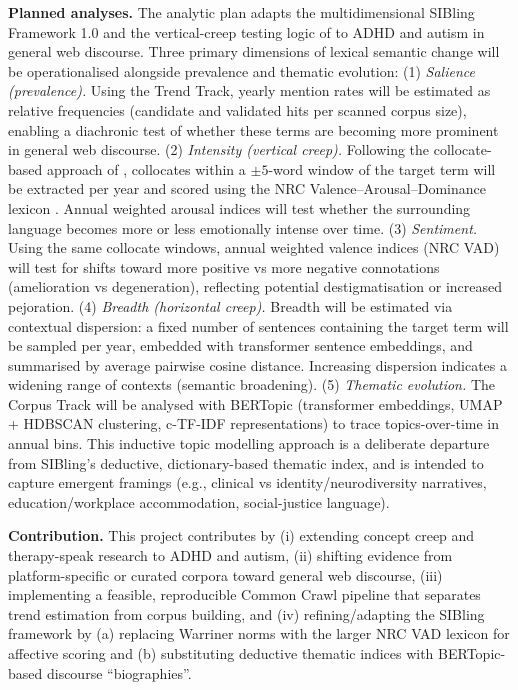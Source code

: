 \documentclass[12pt,letterpaper]{article}
\begin{document}
	\textbf{Planned analyses.} The analytic plan adapts the multidimensional SIBling Framework 1.0 \citep{baesNaomibaesLexical_semantic_change_framework2024} and the vertical-creep testing logic of \citet{xiaoHaveConceptsAnxiety2023} to ADHD and autism in general web discourse. Three primary dimensions of lexical semantic change will be operationalised alongside prevalence and thematic evolution:
	(1) \emph{Salience (prevalence).} Using the Trend Track, yearly mention rates will be estimated as relative frequencies (candidate and validated hits per scanned corpus size), enabling a diachronic test of whether these terms are becoming more prominent in general web discourse.
	(2) \emph{Intensity (vertical creep).} Following the collocate-based approach of \citet{xiaoHaveConceptsAnxiety2023}, collocates within a $\pm 5$-word window of the target term will be extracted per year and scored using the NRC Valence--Arousal--Dominance lexicon \citep{mohammadSaifVADLexicon2025}. Annual weighted arousal indices will test whether the surrounding language becomes more or less emotionally intense over time.
	(3) \emph{Sentiment.} Using the same collocate windows, annual weighted valence indices (NRC VAD) will test for shifts toward more positive vs more negative connotations (amelioration vs degeneration), reflecting potential destigmatisation or increased pejoration.
	(4) \emph{Breadth (horizontal creep).} Breadth will be estimated via contextual dispersion: a fixed number of sentences containing the target term will be sampled per year, embedded with transformer sentence embeddings, and summarised by average pairwise cosine distance. Increasing dispersion indicates a widening range of contexts (semantic broadening).
	(5) \emph{Thematic evolution.} The Corpus Track will be analysed with BERTopic (transformer embeddings, UMAP + HDBSCAN clustering, c-TF-IDF representations) to trace topics-over-time in annual bins. This inductive topic modelling approach is a deliberate departure from SIBling’s deductive, dictionary-based thematic index, and is intended to capture emergent framings (e.g., clinical vs identity/neurodiversity narratives, education/workplace accommodation, social-justice language).
	
	\textbf{Contribution.} This project contributes by (i) extending concept creep and therapy-speak research to ADHD and autism, (ii) shifting evidence from platform-specific or curated corpora toward general web discourse, (iii) implementing a feasible, reproducible Common Crawl pipeline that separates trend estimation from corpus building, and (iv) refining/adapting the SIBling framework by (a) replacing Warriner norms with the larger NRC VAD lexicon for affective scoring and (b) substituting deductive thematic indices with BERTopic-based discourse ``biographies''.
	
\end{document}
